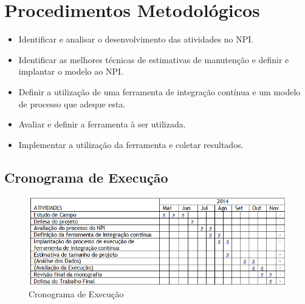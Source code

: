 \chapter{Procedimentos Metodológicos}\label{metodologia}

\begin{itemize}
\item Identificar e analisar o desenvolvimento das atividades no NPI.
\item Identificar as melhores técnicas de estimativas de manutenção e definir e implantar o modelo ao NPI.
\item Definir a utilização de uma ferramenta de integração contínua e um modelo de processo que adeque esta.
\item Avaliar e definir a ferramenta à ser utilizada.
\item Implementar a utilização da ferramenta e coletar resultados.
\end{itemize}

\section{Cronograma de Execução}
\begin{figure}[tbh]
\centering
\includegraphics[width=0.9\linewidth]{./images/cronograma}
\caption[Cronograma de Execução]{Cronograma de Execução}
\label{fig:Cronograma}
\end{figure}